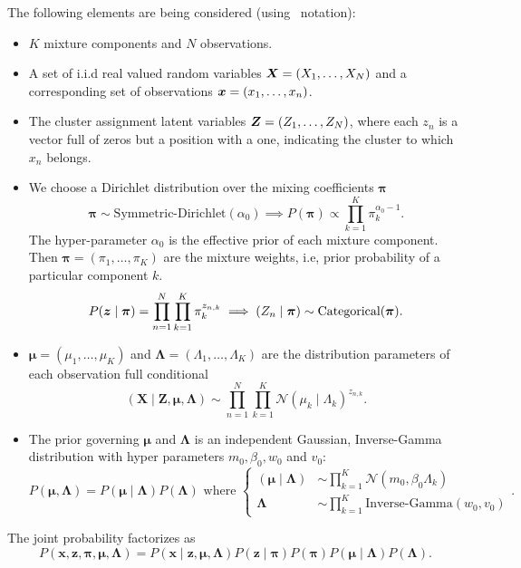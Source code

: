 The following elements are being considered (using~\cite{bishop2006pattern} notation):
\begin{itemize}\setlength\itemsep{1em}
  \item \(K\) mixture components and \(N\) observations.
  \item A set of i.i.d real valued random variables \(\bm{X} = (X_{1},\dots, X_{N})\) and a corresponding set of observations \(\bm{x} = (x_{1},\dots, x_{n})\).
  \item The cluster assignment latent variables \(\bm{Z} = (Z_{1}, \dots, Z_{N})\), where each \(z_{n}\) is a vector full of zeros but a position with a one, indicating the cluster to which \( x_n \) belongs.
  \item We choose a Dirichlet distribution over the mixing coefficients \(\bm{\pi}\)
    \[
    \bm{\pi} \sim \text{Symmetric-Dirichlet}(\alpha_{0}) \implies P(\bm{\pi}) \propto \prod_{k=1}^{K}\pi_{k}^{\alpha_{0}-1}.
    \]
    The hyper-parameter \(\alpha_{0}\) is the effective prior of each mixture component. Then \(\bm{\pi} = (\pi_{1},\dots,\pi_{K})\) are the mixture weights, i.e, prior probability of a particular component \(k\).
    \[
    P(\bm{z}\mid \bm{\pi}) = \prod_{n=1}^{N}\prod_{k=1}^{K}\pi_{k}^{z_{n,k}} \implies (Z_{n} \mid \bm{\pi}) \sim \text{Categorical}(\bm{\pi}).
    \]
  \item \(\bm{\mu} = (\mu_{1},\dots,\mu_{K})\) and \(\bm{\Lambda} = (\Lambda_{1},\dots,\Lambda_{K})\) are the distribution parameters of each observation full conditional
    \[
    (\bm{X} \mid \bm{Z}, \bm{\mu}, \bm{\Lambda}) \sim \prod_{n=1}^{N}\prod_{k=1}^{K}\mathcal{N}(\mu_{k} \mid \Lambda_{k})^{z_{n,k}}.
    \]
  \item The prior governing \(\bm{\mu}\) and \(\bm{\Lambda}\) is an independent Gaussian, Inverse-Gamma distribution with hyper parameters \(m_{0}, \beta_{0}, w_{0}\) and \(v_{0}\):
    \[
    P(\bm{\mu}, \bm{\Lambda}) = P(\bm{\mu} \mid \bm{\Lambda})P(\bm{\Lambda}) \text{ where }
    \begin{cases}
      (\bm{\mu}\mid\bm{\Lambda}) &\sim \displaystyle\prod_{k=1}^{K}\mathcal{N}(m_{0}, \beta_{0}\Lambda_{k})\\
      \bm{\Lambda} &\sim \displaystyle\prod_{k=1}^{K}\text{Inverse-Gamma}(w_{0}, v_{0})
      \end{cases}.
    \]
\end{itemize}

The joint probability factorizes as
\[
  P(\bm{x}, \bm{z}, \bm{\pi}, \bm{\mu}, \bm{\Lambda}) = P(\bm{x}\mid \bm{z}, \bm{\mu}, \bm{\Lambda})P(\bm{z}\mid \bm{\pi})P(\bm{\pi})P(\bm{\mu}\mid \bm{\Lambda})P(\bm{\Lambda}).
\]

